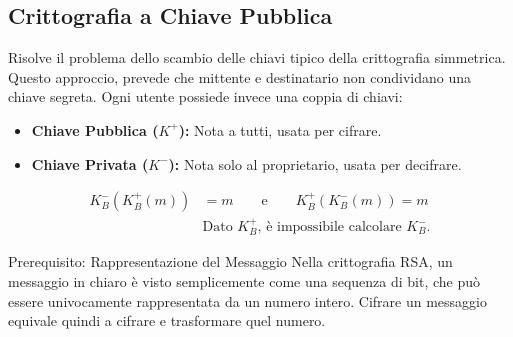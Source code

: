 \documentclass[a4paper,12pt]{report}
\newcommand{\KBp}{K_B^+} %
\newcommand{\KBm}{K_B^-}
\begin{document}
\newpage
\subsection{Crittografia a Chiave Pubblica}
Risolve il problema dello scambio delle chiavi tipico della crittografia simmetrica. Questo approccio, prevede che mittente e destinatario non condividano una chiave segreta. Ogni utente possiede invece una coppia di chiavi:
\begin{itemize}
    \item \textbf{Chiave Pubblica ($K^+$):} Nota a tutti, usata per cifrare.
    \item \textbf{Chiave Privata ($K^-$):} Nota solo al proprietario, usata per decifrare.
\end{itemize}

\begin{tcolorbox}[defbox,title=Propriet\`a fondamentali]
\begin{align*}
  \KBm\!\left(\KBp(m)\right) &= m \qquad \text{e} \qquad \KBp\!\left(\KBm(m)\right) = m \\
  &\text{Dato } \KBp\text{, \`e impossibile calcolare }\KBm.
\end{align*}
\end{tcolorbox}

\begin{notebox}{Prerequisito: Rappresentazione del Messaggio}
Nella crittografia RSA, un messaggio in chiaro è visto semplicemente come una sequenza di bit, che può essere univocamente rappresentata da un numero intero. Cifrare un messaggio equivale quindi a cifrare e trasformare quel numero.
\end{notebox}
\end{document}
